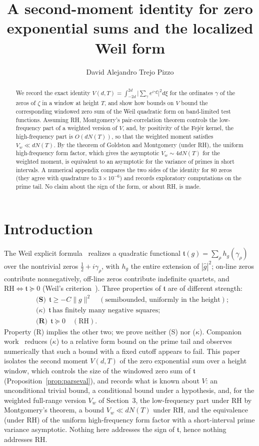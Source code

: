\documentclass[11pt]{amsart}
\title[A Second-Moment Identity and the Localized Weil Form]{A second-moment
identity for zero exponential sums and the localized Weil form}
\author{David Alejandro Trejo Pizzo}
\theoremstyle{definition}
\theoremstyle{remark}
\newcommand{\ft}{\mathfrak t}
\newcommand{\RH}{\mathrm{RH}}
\begin{document}
\begin{abstract}
We record the exact identity
$V(d,T)=\int_{-2d}^{2d}\bigl|\sum_\gamma e^{i\gamma\xi}\bigr|^2d\xi$ for the
ordinates $\gamma$ of the zeros of $\zeta$ in a window at height $T$, and show
how bounds on $V$ bound the corresponding windowed zero sum of the Weil
quadratic form on band-limited test functions. Assuming RH, Montgomery's
pair-correlation theorem controls the low-frequency part of a weighted version
of $V$, and, by positivity of the Fej\'er kernel, the high-frequency part is
$O(dN(T))$, so that the weighted moment satisfies $V_w\ll dN(T)$. By the
theorem of Goldston and Montgomery (under RH), the uniform high-frequency form
factor, which gives the asymptotic $V_w\sim4dN(T)$ for the weighted moment, is
equivalent to an asymptotic
for the variance of primes in short intervals. A numerical appendix compares
the two sides of the identity for $80$ zeros (they agree with quadrature to
$3\times10^{-6}$) and records exploratory computations on the prime tail. No
claim about the sign of the form, or about RH, is made.
\end{abstract}
\maketitle

\tableofcontents
\newpage

\section{Introduction}
The Weil explicit formula~\cite{Weil} realizes a quadratic functional $\ft(g)=\sum_\rho
h_g(\gamma_\rho)$ over the nontrivial zeros $\tfrac12+i\gamma_\rho$, with $h_g$
the entire extension of $|\widehat g|^2$; on-line zeros contribute nonnegatively,
off-line zeros contribute indefinite quartets, and $\RH\iff\ft\succeq0$ (Weil's
criterion~\cite{Weil}). Three properties of $\ft$ are of different strength:
\begin{align*}
&\textbf{(S)}\ \ \ft\ge-C\|g\|^2\quad(\text{semibounded, uniformly in the height});\\
&\textbf{($\kappa$)}\ \ \ft\ \text{has finitely many negative squares};\\
&\textbf{(R)}\ \ \ft\succeq0\quad(\RH).
\end{align*}
Property (R) implies the other two; we prove neither (S) nor ($\kappa$).
Companion work~\cite{RP16} reduces ($\kappa$) to a relative form bound on the
prime tail and observes numerically that such a bound with a fixed cutoff
appears to fail. This paper isolates the second moment $V(d,T)$ of the zero
exponential sum over a height window, which controls the size of the windowed
zero sum of $\ft$ (Proposition~\ref{prop:parseval}), and records what is known
about $V$: an unconditional trivial bound, a conditional bound under a
hypothesis, and, for the weighted full-range version $V_w$ of Section~3, the
low-frequency part under RH by Montgomery's theorem, a bound $V_w\ll dN(T)$
under RH, and the equivalence (under RH) of the uniform high-frequency form factor with a
short-interval prime variance asymptotic. Nothing here addresses the sign of
$\ft$, hence nothing addresses RH.
\end{document}

